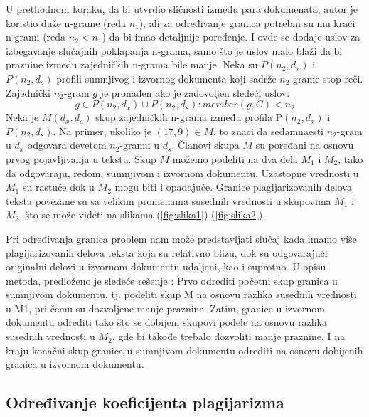 \documentclass[a4paper]{article}
\begin{document}
\par U prethodnom koraku, da bi utvrdio sličnosti između para dokumenata, autor je koristio duže n-grame (reda \(n_{1}\)), ali za određivanje granica potrebni su mu kraći n-grami (reda \(n_{2} < n_{1}\)) da bi imao detaljnije poređenje. I ovde se dodaje uslov za izbegavanje slučajnih poklapanja n-grama, samo što je uslov malo blaži da bi praznine između zajedničkih n-grama bile manje. Neka su \(P(n_{2}, d_{x})\) i \(P(n_{2}, d_{s})\) profili sumnjivog i izvornog dokumenta koji sadrže \(n_{2}\)-grame stop-reči. Zajednički \(n_{2}\)-gram \(g\) je pronađen ako je zadovoljen sledeći uslov:
 \[g \in P(n_{2} ,d_{x}) \cup P(n_{2} ,d_{s} ): member(g,C)<n_{2}\]
Neka je \(M(d_{x},d_{s})\) skup zajedničkih n-grama između profila P\((n_{2},d_{x})\) i \(P(n_{2},d_{s})\). Na primer, ukoliko je \((17,9) \in M\), to  znaci da sedamnaesti \(n_{2}\)-gram u \(d_{x}\) odgovara devetom \(n_{2}\)-gramu u \(d_{s}\). Članovi skupa \(M\) su poređani na osnovu prvog pojavljivanja u tekstu. Skup \(M\) možemo podeliti na dva dela \(M_{1}\) i \(M_{2}\), tako da odgovaraju, redom, sumnjivom i izvornom dokumentu. Uzastopne vrednosti u \(M_{1}\) su rastuće dok u \(M_{2}\) mogu biti  i opadajuće. Granice plagijarizovanih delova teksta povezane su sa velikim promenama susednih vrednosti u skupovima \(M_{1}\) i \(M_{2}\), što se može videti na slikama (\ref{fig:slika1}) (\ref{fig:slika2}).

\par Pri određivanja granica problem nam može predstavljati slučaj kada imamo više plagijarizovanih delova teksta koja su relativno  blizu, dok su odgovarajući originalni delovi u izvornom dokumentu udaljeni, kao i suprotno. U opisu metoda, predloženo je sledeće rešenje \cite{stamatatos} : Prvo odrediti početni skup granica u sumnjivom dokumentu, tj. podeliti skup M na osnovu razlika susednih vrednosti u M1, pri čemu su dozvoljene manje praznine. Zatim, granice u izvornom dokumentu odrediti tako što se dobijeni  skupovi podele na osnovu razlika susednih vrednosti u \(M_{2}\), gde bi takođe trebalo dozvoliti manje praznine. I na kraju konačni  skup granica u sumnjivom dokumentu odrediti na osnovu dobijenih granica u izvornom dokumentu.    

\subsection{Određivanje koeficijenta plagijarizma}
\label{subsec:odredjivanje koeficijenta plagijarizma}
\end{document}
